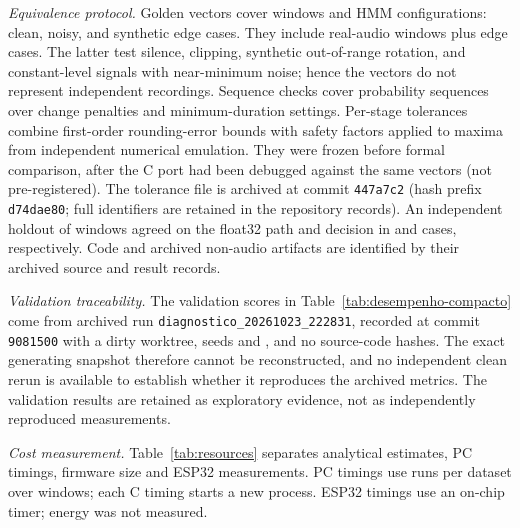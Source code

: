 \documentclass[conference]{IEEEtran}
\newif\ifwip
\begin{document}
\emph{Equivalence protocol.} Golden vectors cover \VEqCases{} windows and
\VEqSeqCombos{} HMM configurations: \VEqCleanCases{} clean, \VEqNoisyCases{} noisy, and
\VEqEdgeCases{} synthetic edge cases. They include \VEqRealCases{} real-audio windows plus
\VEqEdgeCases{} edge cases. The latter test silence, clipping, synthetic out-of-range rotation,
and constant-level signals with near-minimum noise; hence the \VEqCases{} vectors do not
represent \VEqCases{} independent recordings. Sequence checks cover \VEqGoldSeqs{} probability
sequences over \VParNChangePen{} change penalties and \VEqMinDurValues{} minimum-duration
settings. Per-stage tolerances combine first-order rounding-error bounds with safety factors
applied to maxima from independent numerical emulation. They were frozen before formal
comparison, after the C port had been debugged against the same vectors (not pre-registered).
The tolerance file is archived at commit \texttt{447a7c2} (hash prefix
\texttt{d74dae80}; full identifiers are retained in the repository records). An independent
holdout of \audHoldoutN{} windows agreed on the float32 path and decision in
\audHoldoutFloatPathSame{} and \audHoldoutFloatDecSame{} cases, respectively. Code and archived
non-audio artifacts are identified by their archived source and result records.

\emph{Validation traceability.} The validation scores in Table~\ref{tab:desempenho-compacto}
come from archived run \texttt{diagnostico\_20261023\_222831}, recorded at commit
\texttt{9081500} with a dirty worktree, seeds
\VDataSeedSplit{} and \VDataSeedBoot{}, and no
source-code hashes. The exact generating snapshot therefore cannot be reconstructed, and no
independent clean rerun is available to establish whether it reproduces the archived metrics.
The validation results are retained as exploratory evidence, not as independently reproduced
measurements.

\ifwip
\emph{Cost measurement.} We keep apart (1) the analytical arena estimate, (2) timings on
the PC (\VPcNIdmt{} timings over \VPcDistinctIdmt{} distinct windows, one new process each, so
warm-up does not warm the C code), (3) \texttt{idf.py size} and (4) on-chip timings on an
\VChipModel{} without PSRAM (\VChipCpuMhz{}\,MHz, \VChipLatBldcN{} windows over UART). Energy is
not measured.
\else
\emph{Cost measurement.} Table~\ref{tab:resources} separates analytical estimates, PC timings,
firmware size and ESP32 measurements. PC timings use \VPcNIdmt{} runs per dataset over
\VPcDistinctIdmt{} windows; each C timing starts a new process. ESP32 timings use an on-chip timer;
energy was not measured.
\fi
\end{document}
